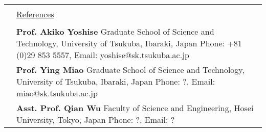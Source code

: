 \documentclass[letterpaper,11pt]{article}
\newcommand{\headingfont}{\LARGE \MakeUppercase }
\newenvironment{SectionTable}[1]{
	\renewcommand*{\arraystretch}{1.0}
	\setlength{\tabcolsep}{10pt}
	\begin{longtable}{Rp{5.2in}} 
		\rule{2.5cm}{4pt} 
		& \underline{#1} \\ %
	}
	{
	\end{longtable}\vspace{-.3cm}
}
\begin{document}



\begin{SectionTable}{\headingfont References}
	&
	\textbf{Prof. Akiko Yoshise} \newline
	Graduate School of Science and Technology, University of Tsukuba, Ibaraki, Japan \newline 
	Phone: +81 (0)29 853 5557, Email: yoshise@sk.tsukuba.ac.jp \\
	
	& 
	\textbf{Prof. Ying Miao} \newline
	Graduate School of Science and Technology, University of Tsukuba, Ibaraki, Japan \newline 
	Phone: ?, Email: miao@sk.tsukuba.ac.jp\\
	
	& 
	\textbf{Asst. Prof. Qian Wu} \newline
	Faculty of Science and Engineering, Hosei University, Tokyo, Japan \newline 
	Phone: ?, Email: ? \\
\end{SectionTable}
	

\label{LastPage}  %
\end{document}

